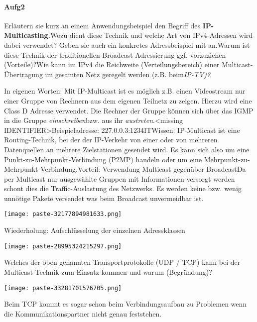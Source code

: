 \documentclass{article}
\begin{document}
\paragraph{Aufg2}
\begin{tcolorbox}[colback=white!10!white,colframe=lightgray!75!black,
  savelowerto=\jobname_ex.tex,breakable,enhanced,lines before break=40]

\justifying
Erläutern sie kurz an einem Anwendungsbeispiel den Begriff des \textbf{IP-Multicasting.}Wozu dient diese Technik und welche Art von IPv4-Adressen wird dabei verwendet? Geben sie auch ein konkretes Adressbeispiel mit an.Warum ist diese Technik der traditionellen Broadcast-Adressierung ggf. vorzuziehen (Vorteile)?Wie kann im IPv4 die Reichweite (Verteilungsbereich) einer Multicast-Übertragung im gesamten Netz geregelt werden (z.B. beim\textit{IP-TV)?}

\tcblower

\justifying
In eigenen Worten: Mit IP-Multicast ist es möglich z.B. einen Videostream nur einer Gruppe von Rechnern aus dem eigenen Teilnetz zu zeigen. Hierzu wird eine Class D Adresse verwendet. Die Rechner der Gruppe können sich über das IGMP in die Gruppe \textit{einschreiben}bzw. aus ihr \textit{austreten}.<missing IDENTIFIER>Beispieladresse: 227.0.0.3:1234ITWissen: IP-Multicast ist eine Routing-Technik, bei der der IP-Verkehr von einer oder von mehreren Datenquellen an mehrere Zielstationen gesendet wird. Es kann sich also um eine Punkt-zu-Mehrpunkt-Verbindung (P2MP) handeln oder um eine Mehrpunkt-zu-Mehrpunkt-Verbindung.Vorteil: Verwendung Multicast gegenüber BroadcastDa per Multicast nur ausgewählte Gruppen mit Informationen versorgt werden schont dies die Traffic-Auslastung des Netzwerks. Es werden keine bzw. wenig unnötige Pakete versendet was beim Broadcast unvermeidbar ist.\begin{center}
\texttt{[image: paste-32177894981633.png]}
\end{center}
Wiederholung: Aufschlüsselung der einzelnen Adressklassen\begin{center}
\texttt{[image: paste-28995324215297.png]}
\end{center}

\end{tcolorbox}
\begin{tcolorbox}[colback=white!10!white,colframe=lightgray!75!black,
  savelowerto=\jobname_ex.tex,breakable,enhanced,lines before break=40]

\justifying
Welches der oben genannten Transportprotokolle (UDP / TCP) kann bei der Multicast-Technik zum Einsatz kommen und warum (Begründung)?

\tcblower

\justifying
\begin{center}
\texttt{[image: paste-33281701576705.png]}
\end{center}
Beim TCP kommt es sogar schon beim Verbindungsaufbau zu Problemen wenn die Kommunikationspartner nicht genau feststehen.
\end{tcolorbox}
\end{document}
